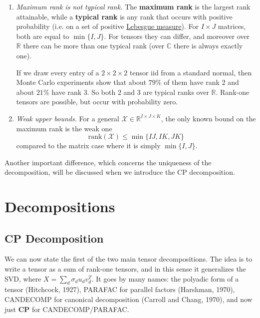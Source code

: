 \begin{enumerate}
    \item \textit{Maximum rank is not typical rank.} The \textbf{maximum rank} is the largest rank attainable, while a \textbf{typical rank} is any rank that occurs with positive probability (i.e. on a set of positive \hyperref[mt-def:lebesgue-measure]{Lebesgue measure}). For $I \times J$ matrices, both are equal to $\min\{I, J\}$. For tensors they can differ, and moreover over $\mathbb{R}$ there can be more than one typical rank (over $\mathbb{C}$ there is always exactly one).

    \begin{example}
      \label{ex:typical-ranks-of-2times2times2-tensors}
      If we draw every entry of a $2 \times 2 \times 2$ tensor iid from a standard normal, then Monte Carlo experiments show that about $79\%$ of them have rank $2$ and about $21\%$ have rank $3$. So both $2$ and $3$ are typical ranks over $\mathbb{R}$. Rank-one tensors are possible, but occur with probability zero.
    \end{example}

    \item \textit{Weak upper bounds.} For a general $\mathcal{X} \in \mathbb{R}^{I \times J \times K}$, the only known bound on the maximum rank is the weak one
    \begin{equation}
      \mathrm{rank}(\mathcal{X}) \leq \min\{IJ, IK, JK\}
    \end{equation}
    compared to the matrix case where it is simply $\min\{I, J\}$.
  \end{enumerate}

  Another important difference, which concerns the uniqueness of the decomposition, will be discussed when we introduce the CP decomposition.

\section{Decompositions}

\subsection{CP Decomposition}

  We can now state the first of the two main tensor decompositions. The idea is to write a tensor as a sum of rank-one tensors, and in this sense it generalizes the SVD, where $X = \sum_d \sigma_d u_d v_d^T$. It goes by many names: the polyadic form of a tensor (Hitchcock, 1927), PARAFAC for parallel factors (Harshman, 1970), CANDECOMP for canonical decomposition (Carroll and Chang, 1970), and now just \textbf{CP} for CANDECOMP/PARAFAC.


